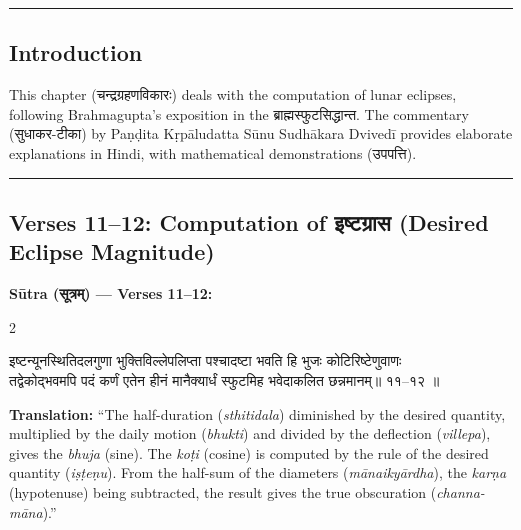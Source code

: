 \documentclass[11pt,a4paper]{article}
\newcommand{\dev}[1]{{\devanagarifont #1}}
\newenvironment{sanskritverse}{%
  \begin{center}\begin{minipage}{0.95\textwidth}
  \setlength{\leftskip}{1em}
  \setlength{\rightskip}{1em}
  \dev
}{\end{minipage}\end{center}}
\begin{document}
\begin{center}
\textcolor{rulecolor}{\rule{0.8\textwidth}{0.5pt}}
\end{center}

\subsection*{Introduction}

This chapter (\dev{चन्द्रग्रहणविकारः}) deals with the computation of lunar eclipses, following Brahmagupta's exposition in the \dev{ब्राह्मस्फुटसिद्धान्त}. The commentary (\dev{सुधाकर-टीका}) by Paṇḍita Kṛpāludatta Sūnu Sudhākara Dvivedī provides elaborate explanations in Hindi, with mathematical demonstrations (\dev{उपपत्ति}).

\begin{center}
\textcolor{rulecolor}{\rule{0.8\textwidth}{0.5pt}}
\end{center}

\subsection{Verses 11--12: Computation of \texorpdfstring{{\devanagarifont इष्टग्रास}}{iṣṭagrāsa} (Desired Eclipse Magnitude)}

\vspace{0.5em}
\noindent\textbf{Sūtra (\dev{सूत्रम्}) — Verses 11--12:}

\begin{paracol}{2}

\begin{sanskritverse}
इष्टन्यूनस्थितिदलगुणा भुक्तिविल्लेपलिप्ता पश्चादष्टा भवति हि भुजः कोटिरिष्टेणुवाणः \\
तद्वेकोद्भवमपि पदं कर्णं एतेन हीनं मानैक्यार्धं स्फुटमिह भवेदाकलित छन्नमानम्॥ ११--१२ ॥
\end{sanskritverse}

\switchcolumn

\textbf{Translation:} ``The half-duration (\textit{sthitidala}) diminished by the desired quantity, multiplied by the daily motion (\textit{bhukti}) and divided by the deflection (\textit{villepa}), gives the \textit{bhuja} (sine). The \textit{koṭi} (cosine) is computed by the rule of the desired quantity (\textit{iṣṭeṇu}). From the half-sum of the diameters (\textit{mānaikyārdha}), the \textit{karṇa} (hypotenuse) being subtracted, the result gives the true obscuration (\textit{channa-māna}).''

\end{paracol}
\end{document}
